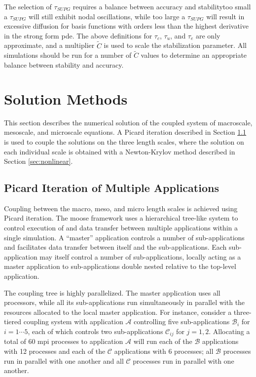 The selection of \(\tau_{SUPG}\) requires a balance between accuracy and stability\mdash too small a \(\tau_{SUPG}\) will still exhibit nodal oscillations, while too large a \(\tau_{SUPG}\) will result in excessive diffusion for basis functions with orders less than the highest derivative in the strong form \gls{pde}. The above definitions for \(\tau_c\), \(\tau_u\), and \(\tau_e\) are only approximate, and a multiplier \(\tilde{C}\) is used to scale the stabilization parameter. All simulations should be run for a number of \(\tilde{C}\) values to determine an appropriate balance between stability and accuracy. \

\section{Solution Methods}
\label{sec:solution}
This section describes the numerical solution of the coupled system of macroscale, mesoscale, and microscale equations. A Picard iteration described in Section \ref{sec:multiscale_solution} is used to couple the solutions on the three length scales, where the solution on each individual scale is obtained with a Newton-Krylov method described in Section \ref{sec:nonlinear}.

\subsection{Picard Iteration of Multiple Applications}
\label{sec:multiscale_solution}

Coupling between the macro, meso, and micro length scales is achieved using Picard iteration. The \gls{moose} framework uses a hierarchical tree-like system to control execution of and data transfer between multiple applications within a single simulation. A ``master'' application controls a number of sub-applications and facilitates data transfer between itself and the sub-applications. Each sub-application may itself control a number of sub-applications, locally acting as a master application to sub-applications double nested relative to the top-level application. 

The coupling tree is highly parallelized. The master application uses all processors, while all its sub-applications run simultaneously in parallel with the resources allocated to the local master application. For instance, consider a three-tiered coupling system with application \(\mathcal{A}\) controlling five sub-applications \(\mathcal{B}_i\) for \(i=1\cdots 5\), each of which controls two sub-applications \(\mathcal{C}_{ij}\) for \(j=1, 2\). Allocating a total of 60 \gls{mpi} processes to application \(\mathcal{A}\) will run each of the \(\mathcal{B}\) applications with 12 processes and each of the \(\mathcal{C}\) applications with 6 processes; all \(\mathcal{B}\) processes run in parallel with one another and all \(\mathcal{C}\) processes run in parallel with one another. 

